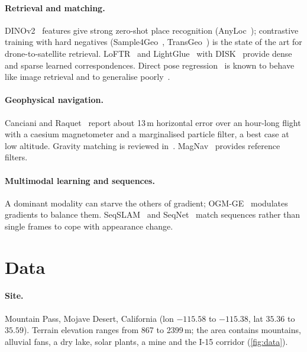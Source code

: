 \documentclass[11pt,a4paper]{article}
\begin{document}
\paragraph{Retrieval and matching.}
DINOv2~\cite{oquab2023dinov2} features give strong zero-shot place recognition (AnyLoc~\cite{keetha2023anyloc});
contrastive training with hard negatives (Sample4Geo~\cite{deuser2023sample4geo}, TransGeo~\cite{zhu2022transgeo})
is the state of the art for drone-to-satellite retrieval. LoFTR~\cite{sun2021loftr} and
LightGlue~\cite{lindenberger2023lightglue} with DISK~\cite{tyszkiewicz2020disk} provide dense and sparse
learned correspondences. Direct pose regression~\cite{kendall2015posenet} is known to behave like image
retrieval and to generalise poorly~\cite{sattler2019limits}.

\paragraph{Geophysical navigation.}
Canciani and Raquet~\cite{canciani2016absolute} report about 13\,m horizontal error over an hour-long
flight with a caesium magnetometer and a marginalised particle filter, a best case at low altitude.
Gravity matching is reviewed in~\cite{gravityreview2026}. MagNav~\cite{gnadt2020magnav,magnavjl}
provides reference filters.

\paragraph{Multimodal learning and sequences.}
A dominant modality can starve the others of gradient; OGM-GE~\cite{peng2022ogm} modulates gradients to
balance them. SeqSLAM~\cite{milford2012seqslam} and SeqNet~\cite{garg2021seqnet} match sequences rather than
single frames to cope with appearance change.

\section{Data}\label{sec:data}
\paragraph{Site.} Mountain Pass, Mojave Desert, California (lon $-115.58$ to $-115.38$, lat $35.36$ to
$35.59$). Terrain elevation ranges from 867 to 2399\,m; the area contains mountains, alluvial fans, a
dry lake, solar plants, a mine and the I-15 corridor (\cref{fig:data}).
\end{document}
